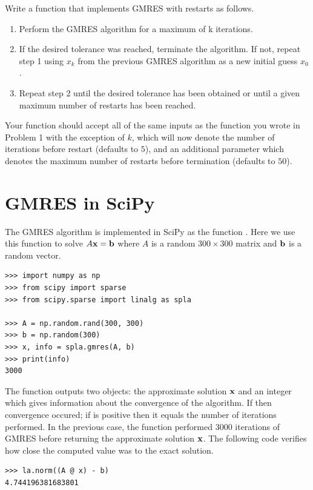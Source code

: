 \begin{problem}
Write a function that implements GMRES with restarts as follows.
\begin{enumerate}
\item Perform the GMRES algorithm for a maximum of k iterations.
\item If the desired tolerance was reached, terminate the algorithm.
If not, repeat step 1 using $x_k$ from the previous GMRES algorithm as a new initial guess $x_0$.
\item Repeat step 2 until the desired tolerance has been obtained or until a given maximum number of restarts has been reached.
\end{enumerate}
Your function should accept all of the same inputs as the function you wrote in Problem 1 with the exception of $k$, which will now denote the number of iterations before restart (defaults to $5$), and an additional parameter  which denotes the maximum number of restarts before termination (defaults to $50$).
\label{prob:GMRESk}
\end{problem}

\section*{GMRES in SciPy} %

The GMRES algorithm is implemented in SciPy as the function .
Here we use this function to solve $A\mathbf{x}=\mathbf{b}$ where $A$ is a random $300 \times 300$ matrix and $\mathbf{b}$ is a random vector.

\begin{lstlisting}
>>> import numpy as np
>>> from scipy import sparse
>>> from scipy.sparse import linalg as spla

>>> A = np.random.rand(300, 300)
>>> b = np.random(300)
>>> x, info = spla.gmres(A, b)
>>> print(info)
3000
\end{lstlisting}

The function outputs two objects: the approximate solution $\mathbf{x}$ and an integer  which gives information about the convergence of the algorithm.
If  then convergence occured; if  is positive then it equals the number of iterations performed.
In the previous case, the function performed 3000 iterations of GMRES before returning the approximate solution $\mathbf{x}$.
The following code verifies how close the computed value was to the exact solution.
\begin{lstlisting}
>>> la.norm((A @ x) - b)
4.744196381683801
\end{lstlisting}

